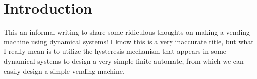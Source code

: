 \documentclass[12pt]{article}
\begin{document}
 
  
  \vspace{-1.8cm}


\newpage

\section{Introduction}
This an informal writing to share some ridiculous thoughts on making a vending machine using dynamical systems! I know this is a very inaccurate title, but what I really mean is to utilize the hysteresis mechanism that appears in some dynamical systems to design a very simple finite automate, from which we can easily design a simple vending machine.   
\end{document}
